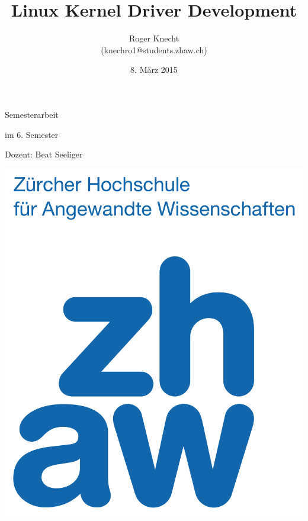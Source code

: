 \title{Linux Kernel Driver Development}
\date{8. März 2015}
\author{Roger Knecht \\ (knechro1@students.zhaw.ch)}

\sffamily
\maketitle
\vfill
\begin{center}
	Semesterarbeit

	\vspace{0.5cm}
	\Large
	\normalsize

	im 6. Semester
	
	\vspace{0.5cm}
	Dozent: Beat Seeliger 
	\vfill
	\vspace{0.7cm}
   \begin{center}
   	\includegraphics[scale=0.2]{images/zhaw}
   \end{center}
	\vfill


\end{center}
